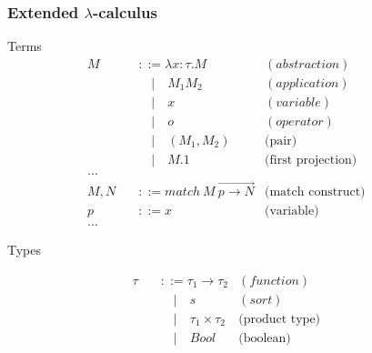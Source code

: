 \documentclass[t,24pt,serif,aspectratio=169]{beamer}
\begin{document}
\begin{frame}[hvid]
    \frametitle{Extended $\lambda$-calculus}
    \begin{multicols}{2}
        \begin{center}
            Terms
            \[
                \begin{aligned}
                    M \quad   & ::= \lambda x : \tau.M                           & (abstraction)             &  & \\
                              & \quad | \quad M_1 M_2                            & (application)             &  & \\
                              & \quad | \quad x                                  & (variable)                &  & \\
                              & \quad | \quad o                                  & (operator)                &  & \\
                              & \quad | \quad (M_1,M_2)                          & \text{(pair)}             &  & \\
                              & \quad | \quad M.1                                & \text{(first projection)} &  & \\
                    ...                                                                                           \\
                    M,N \quad & ::= match \ M \ \overrightarrow{p \rightarrow N} & \text{(match construct)}  &  & \\
                    p \quad   & ::= x                                            & \text{(variable)}         &  & \\
                    ...       &                                                  &                           &  &
                \end{aligned}
            \]
        \end{center}
        \columnbreak
        \begin{center}
            Types
        \end{center}
        \[
            \begin{aligned}
                \tau \quad & ::= \tau_1 \rightarrow \tau_2      & (function)            &  & \\
                           & \quad | \quad s                    & (sort)                &  & \\
                           & \quad | \quad \tau_1 \times \tau_2 & \text{(product type)} &  & \\
                           & \quad | \quad Bool                 & \text{(boolean)}
            \end{aligned}
        \]

    \end{multicols}
\end{frame}
\end{document}
